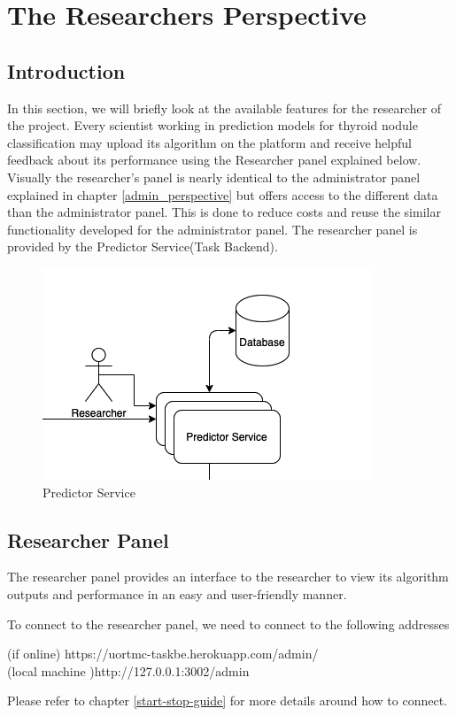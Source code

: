 \chapter{The Researchers Perspective}
\label{researchers_perspective}
	\section{Introduction}
		In this section, we will briefly look at the available features for the researcher of the project. 
		Every scientist working in prediction models for thyroid nodule classification may upload its algorithm 
		on the platform and receive helpful feedback about its performance using the Researcher panel explained below. 
		Visually the researcher's panel is nearly identical to the administrator panel explained in chapter 
		\ref{admin_perspective} but offers access to the different data than the administrator panel. This is done 
		to reduce costs and reuse the similar functionality developed for the administrator panel. The researcher panel 
		is provided by the Predictor Service(Task Backend).
		\begin{figure}[H]
			\iftrue
			\caption{Predictor Service}
			\centering
			\includegraphics[scale=0.5]{figures/taskbe}
			\fi
		\end{figure}
	\section{Researcher Panel}
		The researcher panel provides an interface to the researcher to view its algorithm outputs and performance in an easy and user-friendly manner.
		\begin{note}
			To connect to the researcher panel, we need to connect to the following addresses\\
			\begin{center}
				(if online) https://uortmc-taskbe.herokuapp.com/admin/ \\
				(local machine )http://127.0.0.1:3002/admin
			\end{center}
			Please refer to chapter \ref{start-stop-guide} for more details around how to connect.
		\end{note}
